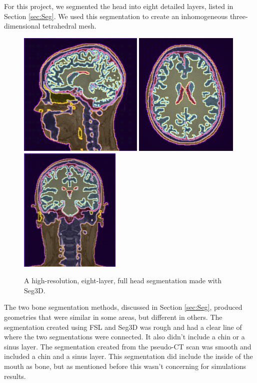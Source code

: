 For this project, we segmented the head into eight detailed layers, listed in Section \ref{sec:Seg}. We used this segmentation to create an inhomogeneous three-dimensional tetrahedral mesh.

\begin{figure}[H]
\begin{center}
\includegraphics[height=2.35in]{Figures/seg_1}
\includegraphics[height=2.35in]{Figures/seg_2}
\includegraphics[height=2.35in]{Figures/seg_3}
\caption{A high-resolution, eight-layer, full head segmentation made with Seg3D.}
\label{fig:fullseg}
\end{center}
\end{figure}

The two bone segmentation methods, discussed in Section \ref{sec:Seg}, produced geometries that were similar in some areas, but different in others. The segmentation created using FSL and Seg3D was rough and had a clear line of where the two segmentations were connected. It also didn't include a chin or a sinus layer. The segmentation created from the pseudo-CT scan was smooth and included a chin and a sinus layer. This segmentation did include the inside of the mouth as bone, but as mentioned before this wasn't concerning for simulations results.

